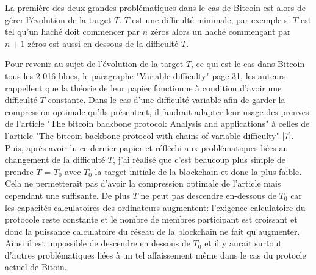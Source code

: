 \documentclass[12pt,a4paper]{article}
\newcommand{\source}[1]{\hyperlink{#1}{[#1]}}
\begin{document}
	La première des deux grandes problématiques dans le cas de Bitcoin est alors de gérer l'évolution de la target $T$. $T$ est une difficulté minimale, par exemple si $T$ est tel qu'un haché doit commencer par $n$ zéros alors un haché commençant par $n + 1$ zéros est aussi en-dessous de la difficulté $T$. %
	
	Pour revenir au sujet de l'évolution de la target $T$, ce qui est le cas dans Bitcoin tous les 2 016 blocs, le paragraphe "Variable difficulty" page 31, les auteurs rappellent que la théorie de leur papier fonctionne à condition d'avoir une difficulté $T$ constante. Dans le cas d'une difficulté variable afin de garder la compression optimale qu'ils présentent, il faudrait adapter leur usage des preuves de l'article "The bitcoin backbone protocol: Analysis and applications" à celles de l'article "The bitcoin backbone protocol with chains of variable difficulty" \source{7}.\\ %
	Puis, après avoir lu ce dernier papier et réfléchi aux problématiques liées au changement de la difficulté $T$, j'ai réalisé que c'est beaucoup plus simple de prendre $T$ = $T_0$ avec $T_0$ la target initiale de la blockchain et donc la plus faible. Cela ne permetterait pas d'avoir la compression optimale de l'article mais cependant une suffisante. De plus $T$ ne peut pas descendre en-dessous de $T_0$ car les capacités calculatoires des ordinateurs augmentent: l'exigence calculatoire du protocole reste constante et le nombre de membres participant est croissant et donc la puissance calculatoire du réseau de la blockchain ne fait qu'augmenter. Ainsi il est impossible de descendre en dessous de $T_0$ et il y aurait surtout d'autres problématiques liées à un tel affaissement même dans le cas du protocle actuel de Bitoin.\\ %
	
\end{document}
